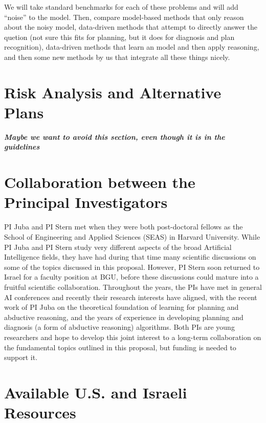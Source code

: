 \documentclass[12pt]{article}
\newcommand{\note}[1]{\textbf{\textit{#1}}}
\begin{document}
We will take standard benchmarks for each of these problems and will add ``noise'' to the model. Then, compare model-based methods that only reason about the noisy model, data-driven methods that attempt to directly answer the quetion (not sure this fits for planning, but it does for diagnosis and plan recognition), data-driven methods that learn an model and then apply reasoning, 
and then some new methods by us that integrate all these things nicely. 


\section{Risk Analysis and Alternative Plans}
\note{Maybe we want to avoid this section, even though it is in the guidelines}

\section{Collaboration between the Principal Investigators}
PI Juba and PI Stern met when they were both post-doctoral fellows as the School of Engineering and Applied Sciences (SEAS) in Harvard University. 
While PI Juba and PI Stern study very different aspects of the broad Artificial Intelligence fields, they have had during that time many scientific discussions on some of the topics discussed in this proposal. However, PI Stern soon returned to Israel for a faculty position at BGU, before these discussions could mature into a fruitful scientific collaboration. 
Throughout the years, the PIs have met in general AI conferences
and recently their research interests have aligned, 
with the recent work of PI Juba on the theoretical foundation of learning for planning and abductive reasoning, and the years of experience in developing planning and diagnosis (a form of abductive reasoning) algorithms. 
Both PIs are young researchers and hope to develop this joint interest to a long-term collaboration on the fundamental topics outlined in this proposal, but funding is needed to support it.  

\section{Available U.S. and Israeli Resources}






\pagebreak


\end{document}
